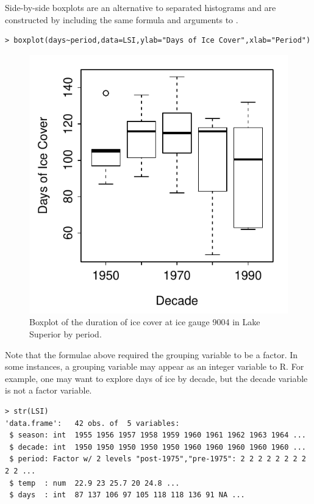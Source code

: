 \documentclass[10pt,openany]{book}\usepackage[]{graphicx}\usepackage[]{color}
\makeatletter
\newenvironment{kframe}{%
 \def\at@end@of@kframe{}%
 \ifinner\ifhmode%
  \def\at@end@of@kframe{\end{minipage}}%
  \begin{minipage}{\columnwidth}%
 \fi\fi%
 \def\FrameCommand##1{\hskip\@totalleftmargin \hskip-\fboxsep
 \colorbox{shadecolor}{##1}\hskip-\fboxsep
     \hskip-\linewidth \hskip-\@totalleftmargin \hskip\columnwidth}%
 \MakeFramed {\advance\hsize-\width
   \@totalleftmargin\z@ \linewidth\hsize
   \@setminipage}}%
 {\par\unskip\endMakeFramed%
 \at@end@of@kframe}
\newenvironment{knitrout}{}{} %
\makeatother
\begin{document}
Side-by-side boxplots  are an alternative to separated histograms and are constructed by including the same formula and  arguments to .
\begin{knitrout}
\color{fgcolor}\begin{kframe}
\begin{verbatim}
> boxplot(days~period,data=LSI,ylab="Days of Ice Cover",xlab="Period")
\end{verbatim}
\end{kframe}\begin{figure}[hbtp]

{\centering \includegraphics[width=.4\linewidth]{Figs/Boxplot1-1} 

}

\caption[Boxplot of the duration of ice cover at ice gauge 9004 in Lake Superior by period]{Boxplot of the duration of ice cover at ice gauge 9004 in Lake Superior by period.}\label{fig:Boxplot1}
\end{figure}


\end{knitrout}

Note that the formulae above required the grouping variable to be a factor. In some instances, a grouping variable may appear as an integer variable to R. For example, one may want to explore days of ice by decade, but the decade variable is not a factor variable.
\begin{knitrout}
\color{fgcolor}\begin{kframe}
\begin{verbatim}
> str(LSI)
'data.frame':	42 obs. of  5 variables:
 $ season: int  1955 1956 1957 1958 1959 1960 1961 1962 1963 1964 ...
 $ decade: int  1950 1950 1950 1950 1950 1960 1960 1960 1960 1960 ...
 $ period: Factor w/ 2 levels "post-1975","pre-1975": 2 2 2 2 2 2 2 2 2 2 ...
 $ temp  : num  22.9 23 25.7 20 24.8 ...
 $ days  : int  87 137 106 97 105 118 118 136 91 NA ...
\end{verbatim}
\end{kframe}
\end{knitrout}
\end{document}
